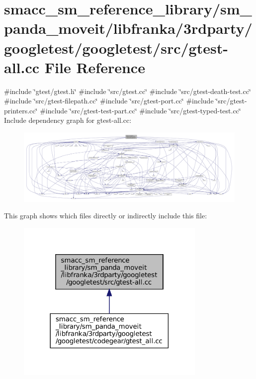 \hypertarget{gtest-all_8cc}{}\section{smacc\+\_\+sm\+\_\+reference\+\_\+library/sm\+\_\+panda\+\_\+moveit/libfranka/3rdparty/googletest/googletest/src/gtest-\/all.cc File Reference}
\label{gtest-all_8cc}
{\ttfamily \#include \char`\"{}gtest/gtest.\+h\char`\"{}}\newline
{\ttfamily \#include \char`\"{}src/gtest.\+cc\char`\"{}}\newline
{\ttfamily \#include \char`\"{}src/gtest-\/death-\/test.\+cc\char`\"{}}\newline
{\ttfamily \#include \char`\"{}src/gtest-\/filepath.\+cc\char`\"{}}\newline
{\ttfamily \#include \char`\"{}src/gtest-\/port.\+cc\char`\"{}}\newline
{\ttfamily \#include \char`\"{}src/gtest-\/printers.\+cc\char`\"{}}\newline
{\ttfamily \#include \char`\"{}src/gtest-\/test-\/part.\+cc\char`\"{}}\newline
{\ttfamily \#include \char`\"{}src/gtest-\/typed-\/test.\+cc\char`\"{}}\newline
Include dependency graph for gtest-\/all.cc\+:
\nopagebreak
\begin{figure}[H]
\begin{center}
\leavevmode
\includegraphics[width=350pt]{gtest-all_8cc__incl}
\end{center}
\end{figure}
This graph shows which files directly or indirectly include this file\+:
\nopagebreak
\begin{figure}[H]
\begin{center}
\leavevmode
\includegraphics[width=258pt]{gtest-all_8cc__dep__incl}
\end{center}
\end{figure}
